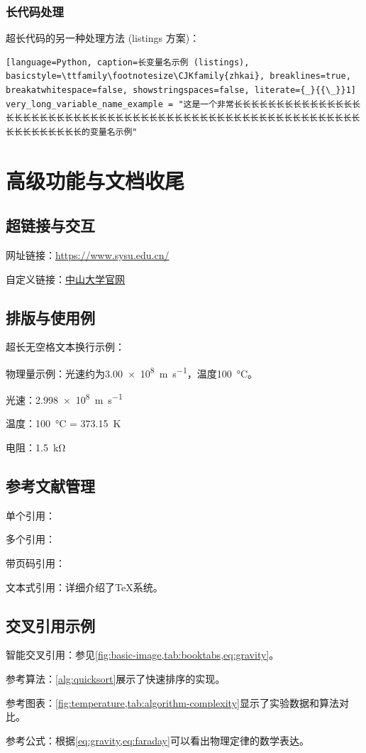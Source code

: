 \documentclass[../main]{subfiles}
\begin{document}
\subsubsection{长代码处理}
超长代码的另一种处理方法 (listings 方案)：
\begin{lstlisting}[language=Python, caption=长变量名示例 (listings), basicstyle=\ttfamily\footnotesize\CJKfamily{zhkai}, breaklines=true, breakatwhitespace=false, showstringspaces=false, literate={_}{{\_}}1]
very_long_variable_name_example = "这是一个非常长长长长长长长长长长长长长长长长长长长长长长长长长长长长长长长长长长长长长长长长长长长长长长长长长长长长长长长长长长长长长长长长长长的变量名示例"
\end{lstlisting}

\section{高级功能与文档收尾}

\subsection{超链接与交互}
网址链接：\url{https://www.sysu.edu.cn/}

自定义链接：\href{https://www.sysu.edu.cn/}{中山大学官网}

\subsection{排版与使用例}
超长无空格文本换行示例：

物理量示例：光速约为\SI{3.00e8}{\meter\per\second}，温度\SI{100}{\degreeCelsius}。

光速：\SI{2.998e8}{\meter\per\second}

温度：\SI{100}{\degreeCelsius} = \SI{373.15}{\kelvin}

电阻：\SI{1.5}{\kilo\ohm}

\subsection{参考文献管理}
单个引用：\autocite{knuth1986texbook}

多个引用：\autocite{vaswani2017attention,brown2020language}

带页码引用：\autocite[第35页]{wang2010zhongwen}

文本式引用：\textcite{knuth1986texbook}详细介绍了TeX系统。

\subsection{交叉引用示例}
智能交叉引用：参见\cref{fig:basic-image,tab:booktabs,eq:gravity}。

参考算法：\cref{alg:quicksort}展示了快速排序的实现。

参考图表：\cref{fig:temperature,tab:algorithm-complexity}显示了实验数据和算法对比。

参考公式：根据\cref{eq:gravity,eq:faraday}可以看出物理定律的数学表达。
\end{document}
